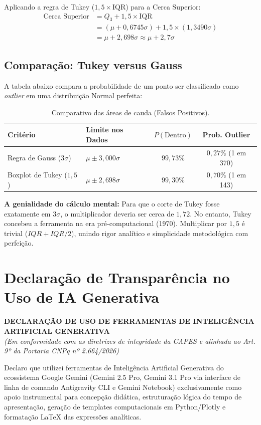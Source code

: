 \documentclass[12pt,a4paper]{article}
\begin{document}
Aplicando a regra de Tukey ($1,5 \times \text{IQR}$) para a Cerca Superior:
\begin{align}
\text{Cerca Superior} &= Q_3 + 1,5 \times \text{IQR} \nonumber \\
&= (\mu + 0,6745\sigma) + 1,5 \times (1,3490\sigma) \nonumber \\
&= \mu + 2,698\sigma \approx \mu + 2,7\sigma
\end{align}

\subsection{Comparação: Tukey versus Gauss}
A tabela abaixo compara a probabilidade de um ponto ser classificado como \textit{outlier} em uma distribuição Normal perfeita:

\begin{table}[H]
\centering
\begin{tabular}{@{}llcc@{}}
\toprule
\textbf{Critério} & \textbf{Limite nos Dados} & \textbf{$P(\text{Dentro})$} & \textbf{Prob. Outlier} \\ \midrule
Regra de Gauss ($3\sigma$) & $\mu \pm 3,000\sigma$ & $99,73\%$ & $0,27\%$ (1 em 370) \\
Boxplot de Tukey ($1,5$) & $\mu \pm 2,698\sigma$ & $99,30\%$ & $0,70\%$ (1 em 143) \\ \bottomrule
\end{tabular}
\caption{Comparativo das áreas de cauda (Falsos Positivos).}
\end{table}

\textbf{A genialidade do cálculo mental:} Para que o corte de Tukey fosse exatamente em $3\sigma$, o multiplicador deveria ser cerca de $1,72$. No entanto, Tukey concebeu a ferramenta na era pré-computacional (1970). Multiplicar por $1,5$ é trivial ($IQR + IQR/2$), unindo rigor analítico e simplicidade metodológica com perfeição.

\section{Declaração de Transparência no Uso de IA Generativa}
\noindent \textbf{DECLARAÇÃO DE USO DE FERRAMENTAS DE INTELIGÊNCIA ARTIFICIAL GENERATIVA} \\
\textit{(Em conformidade com as diretrizes de integridade da CAPES e alinhada ao Art. 9º da Portaria CNPq nº 2.664/2026)}

Declaro que utilizei ferramentas de Inteligência Artificial Generativa do ecossistema Google Gemini (Gemini 2.5 Pro, Gemini 3.1 Pro via interface de linha de comando Antigravity CLI e Gemini Notebook) exclusivamente como apoio instrumental para concepção didática, estruturação lógica do tempo de apresentação, geração de templates computacionais em Python/Plotly e formatação \LaTeX{} das expressões analíticas.
\end{document}
